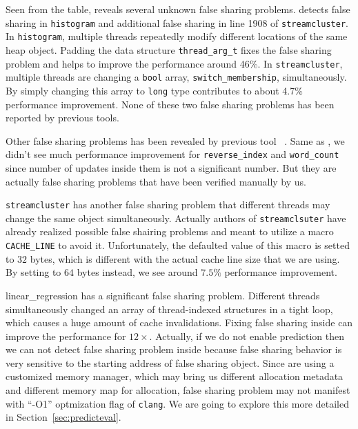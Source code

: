 Seen from the table,  reveals several unknown false sharing problems.  detects 
false sharing in \texttt{histogram} and additional false sharing in line 1908 of
\texttt{streamcluster}. 
In \texttt{histogram}, multiple threads repeatedly modify different locations of the same heap object. 
Padding the data structure \texttt{thread\_arg\_t} fixes the false sharing problem and 
helps to improve the performance around 46\%.
In \texttt{streamcluster}, multiple threads are changing a \texttt{bool} array, \texttt{switch\_membership}, simultaneously. By simply changing this array to \texttt{long} type contributes to about 4.7\% performance improvement. 
None of these two false sharing problems has been reported by previous tools.

Other false sharing problems has been revealed by previous tool \sheriff{}~\cite{sheriff}. 
Same as \sheriff{}, we didn't see much performance improvement for \texttt{reverse\_index} and 
\texttt{word\_count} since number of updates inside them is not a significant number. But they
are actually false sharing problems that have been verified manually by us.

\texttt{streamcluster} has another false sharing problem that different threads may change the same object 
simultaneously. Actually authors of \texttt{streamclsuter} have already realized possible
false shairing problems and meant to utilize a macro \texttt{CACHE\_LINE} to avoid it. Unfortunately,
the defaulted value of this macro is setted to $32$ bytes, which is different with the actual
cache line size that we are using. By setting to $64$ bytes instead, we see around $7.5\%$ performance
improvement.

linear\_regression has a significant false sharing problem. 
Different threads simultaneously changed an array of thread-indexed structures in a tight
loop, which causes a huge amount of cache invalidations. 
Fixing false sharing inside can improve the performance for $12\times$. 
Actually, if we do not enable prediction then 
we can not detect false sharing problem inside because false sharing behavior is 
very sensitive to the starting address of false sharing object. 
Since  are using a customized memory manager, which may
bring us different allocation metadata and different memory map for allocation,
false sharing problem may not manifest with ``-O1'' optmization flag of \texttt{clang}.
We are going to explore this more detailed in Section~\ref{sec:predicteval}.

